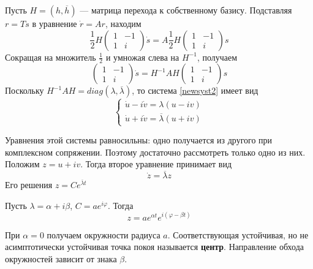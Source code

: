 Пусть $H = (h, \overline{h})$ --- матрица перехода к собственному базису. Подставляя $r = Ts$ в уравнение $\dot{r} = Ar$, находим
\begin{equation*}
    \frac{1}{2}H
    \begin{pmatrix}
        1 & -1 \\
        1 & i
    \end{pmatrix}
    \dot{s} = A\frac{1}{2}H
    \begin{pmatrix}
        1 & -1 \\
        1 & i
    \end{pmatrix}
    s
\end{equation*}
Сокращая на множитель $\frac{1}{2}$ и умножая слева на $H^{-1}$, получаем
\begin{equation}
    \begin{pmatrix}
        1 & -1 \\
        1 & i
    \end{pmatrix}
    \dot{s} = H^{-1}AH
    \begin{pmatrix}
        1 & -1 \\
        1 & i
    \end{pmatrix}
    s \label{newsyst2}
\end{equation}
Поскольку $H^{-1}AH = diag(\lambda, \overline{\lambda})$, то система \eqref{newsyst2} имеет вид
\begin{equation*}
    \begin{cases}
        \dot{u} - i\dot{v} = \lambda(u - iv) \\
        \dot{u} + i\dot{v} = \overline{\lambda}(u + iv)
    \end{cases}
\end{equation*}

Уравнения этой системы равносильны: одно получается из другого при комплексном сопряжении. Поэтому достаточно рассмотреть только одно из них. Положим $z = u + iv$. Тогда второе уравнение принимает вид
\begin{equation*}
    \dot{z} = \overline{\lambda}z
\end{equation*}
Его решения $z = Ce^{\overline{\lambda}t}$

Пусть $\lambda = \alpha + i\beta$, $C = ae^{i\varphi}$. Тогда
\begin{equation*}
    z = ae^{\alpha t}e^{i(\varphi - \beta t)}
\end{equation*}

При $\alpha = 0$ получаем окружности радиуса $a$. Соответствующая устойчивая, но не асимптотически устойчивая точка покоя называется \textbf{центр}. Направление обхода окружностей зависит от знака $\beta$.


